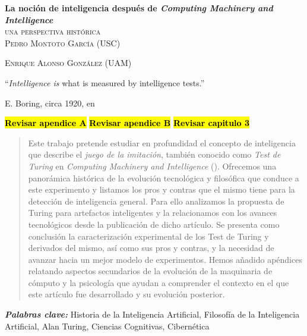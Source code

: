 \documentclass[12pt]{memoir}
\makeatletter
\newlength\drop
\newcommand*\titleM{\begingroup%
\setlength\drop{0.08\textheight}
\centering
\vspace*{\drop}
{\Huge\bfseries La noción de inteligencia después de \textit{Computing Machinery and Intelligence}}\\[\baselineskip]
{\scshape una perspectiva histórica}\\[\baselineskip]
\vfill
{\large\scshape Pedro Montoto García (USC)}\par
{\large\scshape Enrique Alonso González (UAM)}\par
\vfill
{\scshape \@date}\par
\vspace*{2\drop}
\endgroup}
\providecommand{\keywords}[2]{
	\textbf{\textit{#1: }} #2
}
\makeatother
\begin{document}
\pagestyle{empty}


\begin{titlingpage}
\titleM
\end{titlingpage}

\OnehalfSpacing



\setlength{\epigraphwidth}{0.8\textwidth}
\thispagestyle{empty}
\epigraph{``\textit{Intelligence is} what is measured by intelligence tests.''}{E. Boring, circa 1920, en \cite{intDefs}}

\textcolor{red}{\textbf{\hl{Revisar apendice A}}}
\textcolor{red}{\textbf{\hl{Revisar apendice B}}}
\textcolor{red}{\textbf{\hl{Revisar capitulo 3}}}
\newpage


\thispagestyle{empty}
\begin{abstract}
	Este trabajo pretende estudiar en profundidad el concepto de inteligencia que describe el \textit{juego de la imitación}, también conocido como \textit{Test de Turing} en \textit{Computing Machinery and Intelligence} (\cite{Turing1950cmi}). Ofrecemos una panorámica histórica de la evolución tecnológica y filosófica que conduce a este experimento y listamos los pros y contras que el mismo tiene para la detección de inteligencia general. Para ello analizamos la propuesta de Turing para artefactos inteligentes y la relacionamos con los avances tecnológicos desde la publicación de dicho artículo. Se presenta como conclusión la caracterización experimental de los Test de Turing y derivados del mismo, así como sus pros y contras, y la necesidad de avanzar hacia un mejor modelo de experimentos. Hemos añadido apéndices relatando aspectos secundarios de la evolución de la maquinaria de cómputo y la psicología que ayudan a comprender el contexto en el que este artículo fue desarrollado y su evolución posterior.
\end{abstract}

\nocite{Nilsson2009}

\keywords{Palabras clave}{Historia de la Inteligencia Artificial, Filosofía de la Inteligencia Artificial, Alan Turing, Ciencias Cognitivas, Cibernética}

\begin{otherlanguage}{english}
\begin{abstract}
\end{abstract}
\end{otherlanguage}
\end{document}
